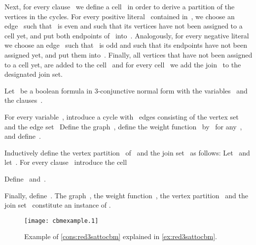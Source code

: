  Next, for every clause~ we define a cell~ in order to derive a partition of the vertices in the cycles. For every positive literal~ contained in~, we choose an edge~ such that~ is even and such that its vertices have not been assigned to a cell yet, and put both endpoints of~ into~. Analogously, for every negative literal~ we choose an edge~ such that~ is odd and such that its endpoints have not been assigned yet, and put them into~. Finally, all vertices that have not been assigned to a cell yet, are added to the cell~ and for every cell~ we add the join~ to the designated join set.
\begin{construction}\label{cons:red3sattocbm}
  Let~ be a boolean formula in 3-conjunctive normal form with the variables~ and the clauses~.

  For every variable~, introduce a cycle with~ edges consisting of the vertex set~ and the edge set~
Define the graph~, define the weight function~ by~ for any~, and define~.

Inductively define the vertex partition~ of~ and the join set~ as follows: Let~ and let~. For every clause~ introduce the cell

Define~ and~.

Finally, define~. The graph~, the weight function~, the vertex partition~ and the join set~ constitute an instance of \pCBMs{}.
  
\end{construction}
\begin{figure}
  \begin{center}
    \texttt{[image: cbmexample.1]}
    \caption{Example of \autoref{cons:red3sattocbm} explained in \autoref{ex:red3sattocbm}.}
    \label{fig:red3sattocbm}
  \end{center}
\end{figure}
